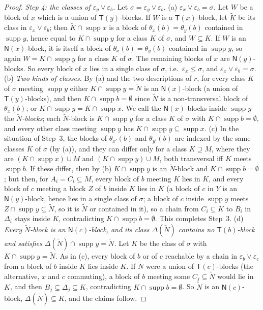 \documentclass[11pt]{amsart}
\theoremstyle{definition}
\newcommand{\supp}{\operatorname{supp}}
\newcommand{\T}{\mathsf{T}}
\newcommand{\N}{\mathsf{N}}
\begin{document}
\begin{proof}
\emph{Step 4: the classes of $\varepsilon_y\vee\varepsilon_b$.} Let $\sigma=\varepsilon_y\vee\varepsilon_b$. (a) \emph{$\varepsilon_x\vee\varepsilon_b=\sigma$.} Let $W$ be a block of $x$ which is a union of $\T(y)$-blocks. If $W$ is a $\T(x)$-block, let $\tilde K$ be its class in $\varepsilon_x\vee\varepsilon_b$; then $\tilde K\cap\supp x$ is a block of $\theta_x(b)=\theta_y(b)$ contained in $\supp y$, hence equal to $K\cap\supp y$ for a class $K$ of $\sigma$, and $W\subseteq K$. If $W$ is an $\N(x)$-block, it is itself a block of $\theta_x(b)=\theta_y(b)$ contained in $\supp y$, so again $W=K\cap\supp y$ for a class $K$ of $\sigma$. The remaining blocks of $x$ are $\N(y)$-blocks. So every block of $x$ lies in a single class of $\sigma$, i.e.\ $\varepsilon_x\le\sigma$, and $\varepsilon_x\vee\varepsilon_b=\sigma$. (b) \emph{Two kinds of classes.} By (a) and the two descriptions of $r$, for every class $K$ of $\sigma$ meeting $\supp y$ either $K\cap\supp y=\tilde N$ is an $\N(x)$-block (a union of $\T(y)$-blocks), and then $K\cap\supp b=\emptyset$ since $\tilde N$ is a non-transversal block of $\theta_x(b)$; or $K\cap\supp y=K\cap\supp x$. We call the $\N(x)$-blocks inside $\supp y$ the \emph{$\tilde N$-blocks}; each $\tilde N$-block is $K\cap\supp y$ for a class $K$ of $\sigma$ with $K\cap\supp b=\emptyset$, and every other class meeting $\supp y$ has $K\cap\supp y\subseteq\supp x$. (c) In the situation of Step~3, the blocks of $\theta_{x'}(b)$ and $\theta_{y'}(b)$ are indexed by the same classes $K$ of $\sigma$ (by (a)), and they can differ only for a class $K\supseteq M$, where they are $(K\cap\supp x)\cup M$ and $(K\cap\supp y)\cup M$, both transversal iff $K$ meets $\supp b$. If these differ, then by (b) $K\cap\supp y$ is an $\tilde N$-block and $K\cap\supp b=\emptyset$; but then, for $A_i=C_i\subseteq M$, every block of $b$ meeting $K$ lies in $K$, and every block of $c$ meeting a block $Z$ of $b$ inside $K$ lies in $K$ (a block of $c$ in $Y$ is an $\N(y)$-block, hence lies in a single class of $\sigma$; a block of $c$ inside $\supp y$ meets $Z\cap\supp y\subseteq\tilde N$, so it is $\tilde N$ or contained in it), so a chain from $C_i\subseteq K$ to $B_i$ in $\Delta_i$ stays inside $K$, contradicting $K\cap\supp b=\emptyset$. This completes Step~3. (d) \emph{Every $\tilde N$-block is an $\N(c)$-block, and its class $\Delta(\tilde N)$ contains no $\T(b)$-block and satisfies $\Delta(\tilde N)\cap\supp y=\tilde N$.} Let $K$ be the class of $\sigma$ with $K\cap\supp y=\tilde N$. As in (c), every block of $b$ or of $c$ reachable by a chain in $\varepsilon_b\vee\varepsilon_c$ from a block of $b$ inside $K$ lies inside $K$. If $\tilde N$ were a union of $\T(c)$-blocks (the alternative, $x$ and $c$ commuting), a block of $b$ meeting some $C_j\subseteq\tilde N$ would lie in $K$, and then $B_j\subseteq\Delta_j\subseteq K$, contradicting $K\cap\supp b=\emptyset$. So $\tilde N$ is an $\N(c)$-block, $\Delta(\tilde N)\subseteq K$, and the claims follow.


\end{proof}
\end{document}
